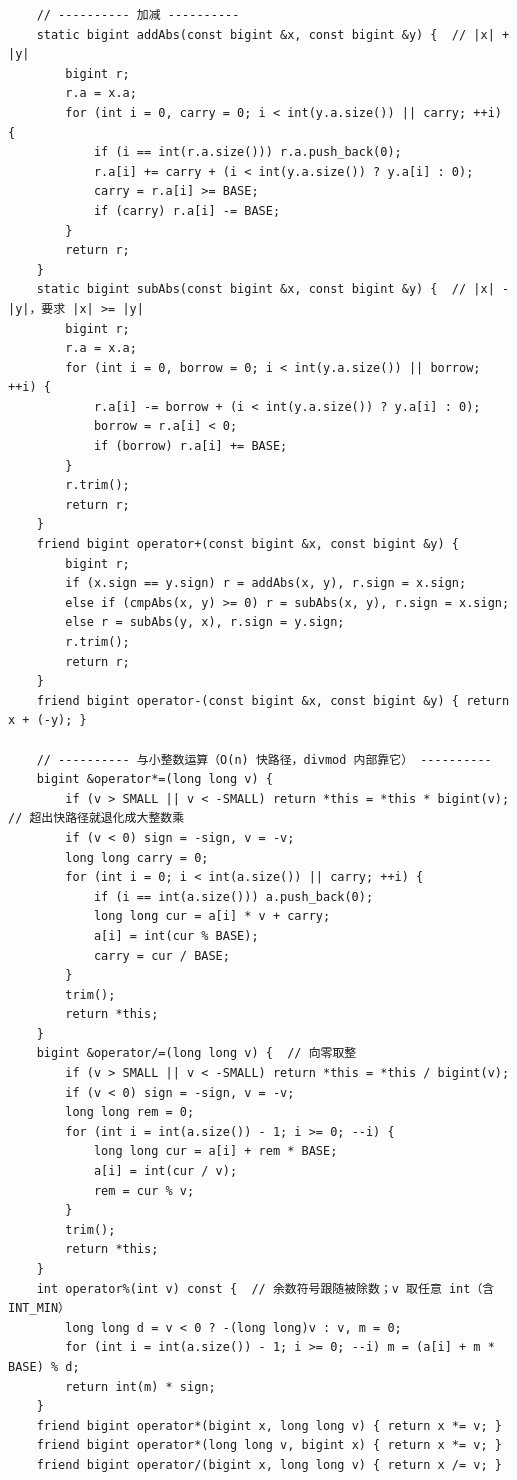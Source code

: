 \begin{verbatim}
    // ---------- 加减 ----------
    static bigint addAbs(const bigint &x, const bigint &y) {  // |x| + |y|
        bigint r;
        r.a = x.a;
        for (int i = 0, carry = 0; i < int(y.a.size()) || carry; ++i) {
            if (i == int(r.a.size())) r.a.push_back(0);
            r.a[i] += carry + (i < int(y.a.size()) ? y.a[i] : 0);
            carry = r.a[i] >= BASE;
            if (carry) r.a[i] -= BASE;
        }
        return r;
    }
    static bigint subAbs(const bigint &x, const bigint &y) {  // |x| - |y|，要求 |x| >= |y|
        bigint r;
        r.a = x.a;
        for (int i = 0, borrow = 0; i < int(y.a.size()) || borrow; ++i) {
            r.a[i] -= borrow + (i < int(y.a.size()) ? y.a[i] : 0);
            borrow = r.a[i] < 0;
            if (borrow) r.a[i] += BASE;
        }
        r.trim();
        return r;
    }
    friend bigint operator+(const bigint &x, const bigint &y) {
        bigint r;
        if (x.sign == y.sign) r = addAbs(x, y), r.sign = x.sign;
        else if (cmpAbs(x, y) >= 0) r = subAbs(x, y), r.sign = x.sign;
        else r = subAbs(y, x), r.sign = y.sign;
        r.trim();
        return r;
    }
    friend bigint operator-(const bigint &x, const bigint &y) { return x + (-y); }

    // ---------- 与小整数运算（O(n) 快路径，divmod 内部靠它） ----------
    bigint &operator*=(long long v) {
        if (v > SMALL || v < -SMALL) return *this = *this * bigint(v);  // 超出快路径就退化成大整数乘
        if (v < 0) sign = -sign, v = -v;
        long long carry = 0;
        for (int i = 0; i < int(a.size()) || carry; ++i) {
            if (i == int(a.size())) a.push_back(0);
            long long cur = a[i] * v + carry;
            a[i] = int(cur % BASE);
            carry = cur / BASE;
        }
        trim();
        return *this;
    }
    bigint &operator/=(long long v) {  // 向零取整
        if (v > SMALL || v < -SMALL) return *this = *this / bigint(v);
        if (v < 0) sign = -sign, v = -v;
        long long rem = 0;
        for (int i = int(a.size()) - 1; i >= 0; --i) {
            long long cur = a[i] + rem * BASE;
            a[i] = int(cur / v);
            rem = cur % v;
        }
        trim();
        return *this;
    }
    int operator%(int v) const {  // 余数符号跟随被除数；v 取任意 int（含 INT_MIN）
        long long d = v < 0 ? -(long long)v : v, m = 0;
        for (int i = int(a.size()) - 1; i >= 0; --i) m = (a[i] + m * BASE) % d;
        return int(m) * sign;
    }
    friend bigint operator*(bigint x, long long v) { return x *= v; }
    friend bigint operator*(long long v, bigint x) { return x *= v; }
    friend bigint operator/(bigint x, long long v) { return x /= v; }


\end{verbatim}
